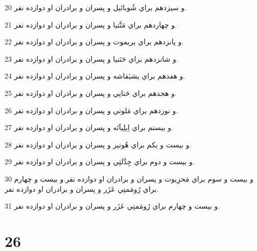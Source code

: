 \par 20 و سيزدهم براي شُوبائيل و پسران و برادران او دوازده نفر.
\par 21 و چهاردهم براي مَتَّتيا و پسران و برادران او دوازده نفر.
\par 22 و پانزدهم براي يريموت و پسران و برادران او دوازده نفر.
\par 23 و شانزدهم براي حَنَنيا و پسران و برادران او دوازده نفر.
\par 24 و هفدهم براي يشبَقاشه و پسران و برادران او دوازده نفر.
\par 25 و هجدهم براي حَنانِي و پسران و برادران او دوازده نفر.
\par 26 و نوزدهم براي مَلوتي و پسران و برادران او دوازده نفر.
\par 27 و بيستم براي اِيلِيآتَه و پسران و برادران او دوازده نفر.
\par 28 و بيست و يکم براي هُوتير و پسران و برادران او دوازده نفر.
\par 29 و بيست و دوم براي جِدَّلتِي و پسران و برادران او دوازده نفر.
\par 30 و بيست و سوم براي مَحزِيوت و پسران و برادران او دوازده نفر.و بيست و چهارم براي رُومَمتِي عَزَر و پسران و برادران او دوازده نفر.
\par 31 و بيست و چهارم براي رُومَمتِي عَزَر و پسران و برادران او دوازده نفر.
 
\chapter{26}

